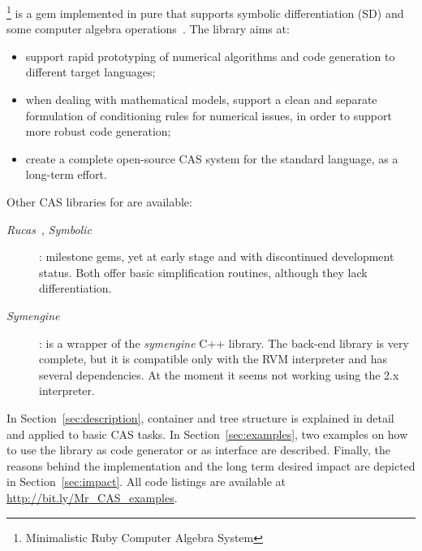 \ragnicas\footnote{Minimalistic Ruby Computer Algebra System} is a gem implemented in pure \Ruby that supports symbolic differentiation (SD) and some computer algebra operations~\cite{von2013modern}. The library aims at:
\begin{itemize}
  \item support rapid prototyping of numerical algorithms and code generation to different target languages;
  \item when dealing with mathematical models, support a clean and separate formulation of conditioning rules for numerical issues, in order to support more robust code generation;
  \item create a complete open-source CAS system for the standard \Ruby language, as a long-term effort.
\end{itemize}

Other CAS libraries for \Ruby are available:
\begin{description}
  \item [\emph{Rucas}~\cite{rucas}, \emph{Symbolic}~\cite{symbolic}]: milestone gems, yet at early stage and with discontinued development status. Both offer basic simplification routines, although they lack differentiation.
  \item [\emph{Symengine}~\cite{symengine}]: is a wrapper of the \emph{symengine} C++ library. The back-end library is very complete, but it is compatible only with the RVM \Ruby interpreter and has several dependencies. 
At the moment it seems not working using the \Ruby 2.x interpreter.
\end{description}

In Section~\ref{sec:description}, \ragnicas container and tree structure is explained in detail and applied to basic CAS tasks. In Section~\ref{sec:examples}, two examples on how to use the library as code generator or as interface are described. Finally, the reasons behind the implementation and the long term desired impact are depicted in Section~\ref{sec:impact}. All code listings are available at \url{http://bit.ly/Mr_CAS_examples}.
